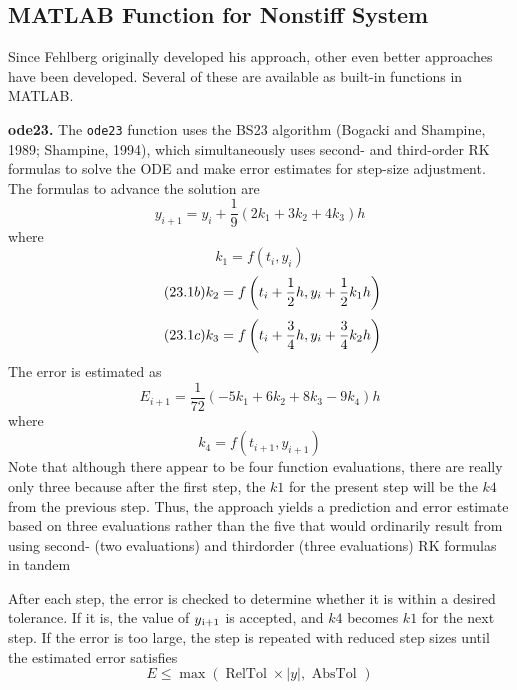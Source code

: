 \documentclass[../main.tex]{subfiles}
\begin{document}
\subsection{MATLAB Function for Nonstiff System}

Since Fehlberg originally developed his approach, other even better approaches have been
developed. Several of these are available as built-in functions in MATLAB.\

\textbf{ode23.} The \texttt{ode23} function uses the BS23 algorithm (Bogacki and Shampine, 1989;
Shampine, 1994), which simultaneously uses second- and third-order RK formulas to solve
the ODE and make error estimates for step-size adjustment. The formulas to advance the
solution are
\begin{equation}
    \tag{23.1}
    y_{i+1}=y_{i}+\frac{1}{9}\left(2 k_{1}+3 k_{2}+4 k_{3}\right) h
\end{equation}
where
\begin{equation}
    \tag{23.1$a$}
    k_{1}=f\left(t_{i}, y_{i}\right)
\end{equation}
\begin{equation}
    \tag{23.1$b$}
    k_{2}=f\left(t_{i}+\frac{1}{2} h, y_{i}+\frac{1}{2} k_{1} h\right)\\
\end{equation}
\begin{equation}
    \tag{23.1$c$}
    k_{3}=f\left(t_{i}+\frac{3}{4} h, y_{i}+\frac{3}{4} k_{2} h\right)\\
\end{equation}
The error is estimated as\
\begin{equation}
    \tag{23.2}
    E_{i+1}=\frac{1}{72}\left(-5 k_{1}+6 k_{2}+8 k_{3}-9 k_{4}\right) h
\end{equation}
where
\begin{equation}
    \tag{23.2$a$}
    k_{4}=f\left(t_{i+1}, y_{i+1}\right)
\end{equation}
Note that although there appear to be four function evaluations, there are really only three
because after the first step, the $k1$ for the present step will be the $k4$ from the previous step.
Thus, the approach yields a prediction and error estimate based on three evaluations rather
than the five that would ordinarily result from using second- (two evaluations) and thirdorder (three evaluations) RK formulas in tandem

After each step, the error is checked to determine whether it is within a desired tolerance. If it is, the value of $y\textsubscript{i+1}$ is accepted, and $k4$ becomes $k1$ for the next step. If the error
is too large, the step is repeated with reduced step sizes until the estimated error satisfies
\begin{equation}
    \tag{23.3}
    E \leq \max (\operatorname{RelTol} \times|y|, \text { AbsTol })
\end{equation}
\end{document}
